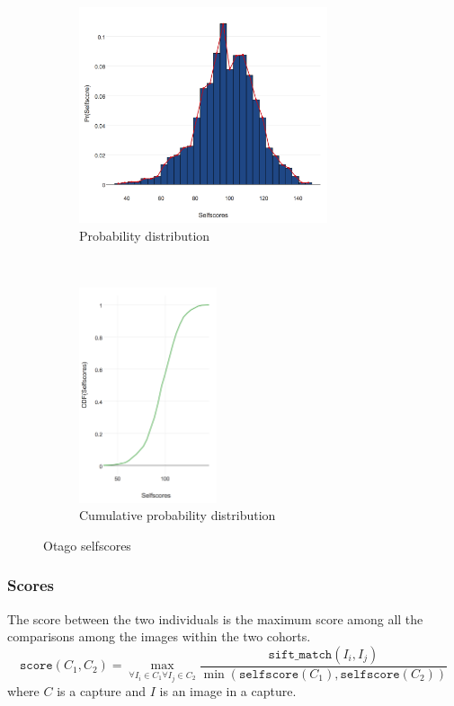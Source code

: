 \begin{figure}[htb]
    \begin{subfigure}[t]{0.6\textwidth}
        \centering
        \includegraphics[height=2.5in]{dataset/otago/selfscores}
        \caption{Probability distribution}
    \end{subfigure}%
    ~
    \begin{subfigure}[t]{0.35\textwidth}
        \centering
        \includegraphics[height=2.5in]{dataset/otago/cdf_selfscores}
        \caption{Cumulative probability distribution}
    \end{subfigure}
    \caption{Otago selfscores}
\end{figure}

\subsubsection{Scores}

The score between the two individuals is the maximum score among all the
comparisons among the images within the two cohorts.
$$\texttt{score}(C_1, C_2) = \max_{\forall I_i \in C_1 \forall I_j \in C_2}
    \frac{\texttt{sift\_match}(I_i, I_j)}{\min(\texttt{selfscore}(C_1),
        \texttt{selfscore}(C_2))}$$
where $C$ is a capture and $I$ is an image in a capture.

